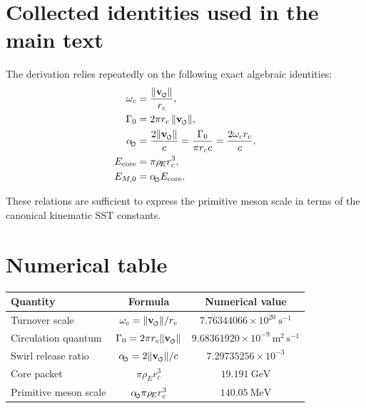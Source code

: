 \documentclass[11pt,a4paper]{article}
\newcommand{\swirlarrow}{\mathchoice{\mkern-2mu\scriptstyle\boldsymbol{\circlearrowleft}}{\mkern-2mu\scriptstyle\boldsymbol{\circlearrowleft}}{\mkern-2mu\scriptscriptstyle\boldsymbol{\circlearrowleft}}{\mkern-2mu\scriptscriptstyle\boldsymbol{\circlearrowleft}}}
\newcommand{\vswirl}{\mathbf{v}_{\swirlarrow}}
\newcommand{\rhoE}{\rho_{\!E}}
\newcommand{\rc}{r_c}
\newcommand{\Gammazero}{\Gamma_0}
\newcommand{\omegac}{\omega_c}
\newcommand{\alphasw}{\alpha_{\!\swirlarrow}}
\begin{document}
\appendix
\section{Collected identities used in the main text}
The derivation relies repeatedly on the following exact algebraic identities:
\begin{align}
\omegac &= \frac{\lVert \vswirl \rVert}{\rc},\\
\Gammazero &= 2\pi \rc\,\lVert \vswirl \rVert,\\
\alphasw &= \frac{2\lVert \vswirl \rVert}{c}
= \frac{\Gammazero}{\pi \rc c}
= \frac{2\omegac\rc}{c},\\
E_{\text{core}} &= \pi\rhoE\rc^{3},\\
E_{M,0} &= \alphasw E_{\text{core}}.
\end{align}

These relations are sufficient to express the primitive meson scale in terms of the canonical kinematic SST constants.

\section{Numerical table}
\begin{center}
\begin{tabular}{lcc}
\toprule
Quantity & Formula & Numerical value \\
\midrule
Turnover scale & \(\omegac = \lVert \vswirl \rVert/\rc\) & \(7.76344066\times 10^{20}\ \mathrm{s^{-1}}\) \\
Circulation quantum & \(\Gammazero = 2\pi \rc\lVert \vswirl \rVert\) & \(9.68361920\times 10^{-9}\ \mathrm{m^{2}\,s^{-1}}\) \\
Swirl release ratio & \(\alphasw = 2\lVert \vswirl \rVert/c\) & \(7.29735256\times 10^{-3}\) \\
Core packet & \(\pi\rhoE\rc^{3}\) & \(19.191\ \mathrm{GeV}\) \\
Primitive meson scale & \(\alphasw\pi\rhoE\rc^{3}\) & \(140.05\ \mathrm{MeV}\) \\
\bottomrule
\end{tabular}
\end{center}
\end{document}

